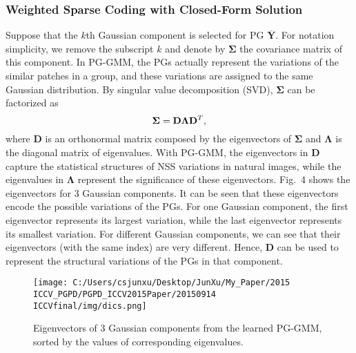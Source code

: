 \subsubsection{Weighted Sparse Coding with Closed-Form Solution}
Suppose that the $k$th Gaussian component is selected for PG $\mathbf{\overline{Y}}$. For notation simplicity, we remove the subscript $k$ and denote by $\mathbf{\Sigma}$ the covariance matrix of this component. In PG-GMM, the PGs actually represent the variations of the similar patches in a group, and these variations are assigned to the same Gaussian distribution. By singular value decomposition (SVD), $\mathbf{\Sigma}$ can be factorized as
\begin{equation}\label{equ10}
\setlength{\abovedisplayskip}{3pt}
\setlength{\belowdisplayskip}{3pt}
\mathbf{\Sigma} = \mathbf{D}\mathbf{\Lambda}\mathbf{D}^{T},
\end{equation}
where $\mathbf{D}$ is an orthonormal matrix composed by the eigenvectors of $\mathbf{\Sigma}$ and $\mathbf{\Lambda}$ is the diagonal matrix of eigenvalues. With PG-GMM, the eigenvectors  in $\mathbf{D}$ capture the statistical structures of NSS variations in natural images, while the eigenvalues in $\mathbf{\Lambda}$ represent the significance of these eigenvectors. Fig.\ 4 shows the eigenvectors for 3 Gaussian components. It can be seen that these eigenvectors encode the possible variations of the PGs. For one Gaussian component, the first eigenvector represents its largest variation, while the last eigenvector represents its smallest variation. For different Gaussian components, we can see that their eigenvectors (with the same index) are very different. Hence, $\mathbf{D}$ can be used to represent the structural variations of the PGs in that component.
\begin{figure}[t]
\centering
\texttt{[image: C:/Users/csjunxu/Desktop/JunXu/My\_Paper/2015 ICCV\_PGPD/PGPD\_ICCV2015Paper/20150914 ICCVfinal/img/dics.png]}
\vspace{-0.1in}
\caption{Eigenvectors of 3 Gaussian components from the learned PG-GMM, sorted by the values of corresponding eigenvalues.}
\vspace{-0.2in}
\label{fig4}
\end{figure}

